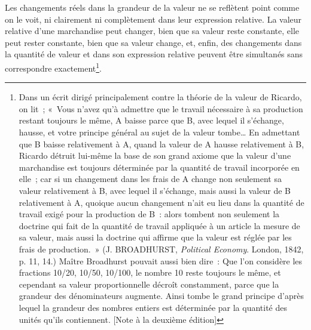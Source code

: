 \documentclass[french,twoside]{book} %
\begin{document}
Les changements réels dans la grandeur de la valeur ne se reflètent point comme on le voit, ni clairement ni complètement dans leur expression relative. La valeur relative d’une marchandise peut changer, bien que sa valeur reste constante, elle peut rester constante, bien que sa valeur change, et, enfin, des changements dans la quantité de valeur et dans son expression relative peuvent être simultanés sans correspondre exactement\footnote{Dans un écrit dirigé principalement contre la théorie de la valeur de Ricardo, on lit ; « Vous n’avez qu’à admettre que le travail nécessaire à sa production restant toujours le même, A baisse parce que B, avec lequel il s’échange, hausse, et votre principe général au sujet de la valeur tombe… En admettant que B baisse relativement à A, quand la valeur de A hausse relativement à B, Ricardo détruit lui-même la base de son grand axiome que la valeur d’une marchandise est toujours déterminée par la quantité de travail incorporée en elle ; car si un changement dans les frais de A change non seulement sa valeur relativement à B, avec lequel il s’échange, mais aussi la valeur de B relativement à A, quoique aucun changement n’ait eu lieu dans la quantité de travail exigé pour la production de B : alors tombent non seulement la doctrine qui fait de la quantité de travail appliquée à un article la mesure de sa valeur, mais aussi la doctrine qui affirme que la valeur est réglée par les frais de production. » (J. BROADHURST, \emph{Political Economy}. London, 1842, p. 11, 14.) Maître Broadhurst pouvait aussi bien dire : Que l’on considère les fractions 10/20, 10/50, 10/100, le nombre 10 reste toujours le même, et cependant sa valeur proportionnelle décroît constamment, parce que la grandeur des dénominateurs augmente. Ainsi tombe le grand principe d’après lequel la grandeur des nombres entiers est déterminée par la quantité des unités qu’ils contiennent. [Note à la deuxième édition]}.
\end{document}
